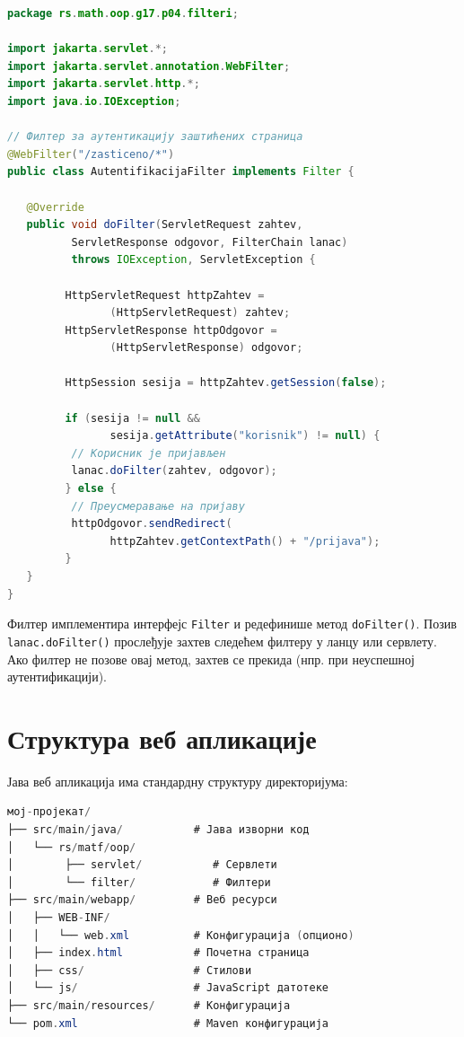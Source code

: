 \begin{lstlisting}[language=Java]
package rs.math.oop.g17.p04.filteri;
 
import jakarta.servlet.*;
import jakarta.servlet.annotation.WebFilter;
import jakarta.servlet.http.*;
import java.io.IOException;
 
// Филтер за аутентикацију заштићених страница
@WebFilter("/zasticeno/*")
public class AutentifikacijaFilter implements Filter {
 
   @Override
   public void doFilter(ServletRequest zahtev,
          ServletResponse odgovor, FilterChain lanac)
          throws IOException, ServletException {
 
         HttpServletRequest httpZahtev =
                (HttpServletRequest) zahtev;
         HttpServletResponse httpOdgovor =
                (HttpServletResponse) odgovor;
 
         HttpSession sesija = httpZahtev.getSession(false);
 
         if (sesija != null &&
                sesija.getAttribute("korisnik") != null) {
          // Корисник је пријављен
          lanac.doFilter(zahtev, odgovor);
         } else {
          // Преусмеравање на пријаву
          httpOdgovor.sendRedirect(
                httpZahtev.getContextPath() + "/prijava");
         }
   }
}
\end{lstlisting}


Филтер имплементира интерфејс \texttt{Filter} и редефинише метод \texttt{doFilter()}. Позив \texttt{lanac.doFilter()} прослеђује захтев следећем филтеру у ланцу или сервлету. Ако филтер не позове овај метод, захтев се прекида (нпр. при неуспешној аутентификацији).


\section{Структура веб апликације}

Јава веб апликација има стандардну структуру директоријума:


\begin{lstlisting}[language=Java]
мој-пројекат/
├── src/main/java/           # Јава изворни код
│   └── rs/matf/oop/
│        ├── servlet/           # Сервлети
│        └── filter/            # Филтери
├── src/main/webapp/         # Веб ресурси
│   ├── WEB-INF/
│   │   └── web.xml          # Конфигурација (опционо)
│   ├── index.html           # Почетна страница
│   ├── css/                 # Стилови
│   └── js/                  # JavaScript датотеке
├── src/main/resources/      # Конфигурација
└── pom.xml                  # Maven конфигурација
\end{lstlisting}


